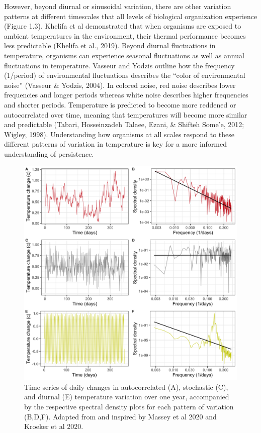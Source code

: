 \documentclass[12pt,twoside]{reedthesis}
\begin{document}
However, beyond diurnal or sinusoidal variation, there are other variation patterns at different timescales that all levels of biological organization experience (Figure 1.3). Khelifa et al demonstrated that when organisms are exposed to ambient temperatures in the environment, their thermal performance becomes less predictable (Khelifa et al., 2019). Beyond diurnal fluctuations in temperature, organisms can experience seasonal fluctuations as well as annual fluctuations in temperature. Vasseur and Yodzis outline how the frequency (1/period) of environmental fluctuations describes the ``color of environmental noise'' (Vasseur \& Yodzis, 2004). In colored noise, red noise describes lower frequencies and longer periods whereas white noise describes higher frequencies and shorter periods. Temperature is predicted to become more reddened or autocorrelated over time, meaning that temperatures will become more similar and predictable (Tabari, Hosseinzadeh Talaee, Ezani, \& Shifteh Some'e, 2012; Wigley, 1998). Understanding how organisms at all scales respond to these different patterns of variation in temperature is key for a more informed understanding of persistence.
\begin{figure}

{\centering \includegraphics[width=0.9\linewidth]{figures/figure4} 

}

\caption[Patterns of variability and spectral density plots]{Time series of daily changes in autocorrelated (A), stochastic (C), and diurnal (E) temperature variation over one year, accompanied by the respective spectral density plots for each pattern of variation (B,D,F). Adapted from and inspired by Massey et al 2020 and Kroeker et al 2020.}\label{fig:unnamed-chunk-5}
\end{figure}
\clearpage
\end{document}
